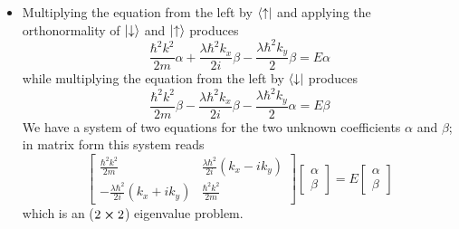 \documentclass[11pt, a4paper]{article}
\newcommand{\ua}{\uparrow}  %
\newcommand{\da}{\downarrow}  %
\begin{document}
\begin{itemize}
	\item Multiplying the equation from the left by $ \bra{\ua} $ and applying the orthonormality of $ \ket{\da} $ and $ \ket{\ua} $ produces
	\begin{equation*}
		\frac{\hbar^{2}k^{2}}{2m} \alpha + \frac{\lambda \hbar^{2}k_{x}}{2i} \beta - \frac{\lambda \hbar^{2}k_{y}}{2} \beta = E \alpha
	\end{equation*}
	while multiplying the equation from the left by $ \bra{\da} $ produces
	\begin{equation*}
		\frac{\hbar^{2}k^{2}}{2m} \beta - \frac{\lambda \hbar^{2}k_{x}}{2i} \beta - \frac{\lambda \hbar^{2}k_{y}}{2} \alpha = E \beta
	\end{equation*}
	We have a system of two equations for the two unknown coefficients $ \alpha $ and $ \beta $; in matrix form this system reads
	\begin{equation*}
		\begin{bmatrix}
		\frac{\hbar^{2}k^{2}}{2m} & \frac{\lambda \hbar^{2}}{2i}(k_{x}-ik_{y}) \\
		-\frac{\lambda \hbar^{2}}{2i}(k_{x}+ik_{y}) & \frac{\hbar^{2}k^{2}}{2m}
		\end{bmatrix}
		\begin{bmatrix}
			\alpha\\
			\beta
		\end{bmatrix}
		= E
		\begin{bmatrix}
			\alpha\\
			\beta
		\end{bmatrix}
	\end{equation*}
	which is an ($ 2 \cross 2 $) eigenvalue problem.
	

\end{itemize}
\end{document}
